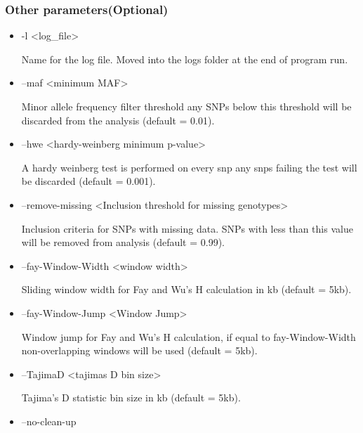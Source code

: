 \documentclass[a4paper,10pt]{article}
\begin{document}
                             \subsubsection{Other parameters(Optional)}
                             \begin{itemize}
                             \item -l <log\_file> 

                             Name for the log file. Moved into the logs folder at the end of program run.

                             \item --maf <minimum MAF>

                             Minor allele frequency filter threshold any SNPs below this threshold
                             will be discarded from the analysis (default = 0.01).

                             \item --hwe <hardy-weinberg minimum p-value>

                             A hardy weinberg test is performed on every snp any snps failing the
                             test will be discarded (default = 0.001).

                             \item --remove-missing <Inclusion threshold for missing genotypes>

                             Inclusion criteria for SNPs with missing data. SNPs with less than
                             this value will be removed from analysis (default = 0.99).

                             \item --fay-Window-Width <window width>

                             Sliding window width for Fay and Wu's H calculation in kb (default = 5kb).

                             \item --fay-Window-Jump <Window Jump>

                             Window jump for Fay and Wu's H calculation, if equal to
                             fay-Window-Width non-overlapping windows will be used (default =
                             5kb).

                             \item --TajimaD <tajimas D bin size>

                             Tajima's D statistic bin size in kb (default = 5kb).
                             \item --no-clean-up 


\end{itemize}
\end{document}
